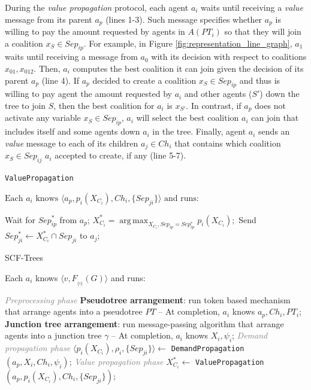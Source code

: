 \documentclass[11pt, twoside, titlepage, a4paper, openright]{report}
\begin{document}
During the \emph{value propagation} protocol, each agent $a_i$ waits until
receiving a \emph{value} message from its parent $a_p$ (lines 1-3). Such message
specifies whether $a_p$ is willing to pay the amount requested by agents in
$A(PT_i)$ so that they will join a coalition $x_S\in Sep_{ip}$. For example, in
Figure \ref{fig:representation_line_graph}, $a_1$ waits until receiving a
message from $a_0$ with its decision with respect to coalitions
$x_{01},x_{012}$. Then, $a_i$ computes the best coalition it can join given the
decision of its parent $a_p$ (line 4). If $a_p$ decided to create a coalition
$x_S\in Sep_{ip}$ and thus is willing to pay agent the amount requested by $a_i$
and other agents ($S'$) down the tree to join $S$, then the best coalition for
$a_i$ is $x_{S'}$. In contrast, if $a_p$ does not activate any variable $x_S\in
Sep_{ip}$, $a_i$ will select the best coalition
 $a_i$ can join that includes itself and some agents down $a_i$ in
the tree. Finally, agent $a_i$ sends an \emph{value} message to each of its
children $a_j \in Ch_i$ that contains which coalition $x_S\in Sep_{ij}$ $a_i$ accepted to
create, if any (line 5-7).

\begin{algorithm}[!tb]
\caption{\texttt{ValuePropagation}} 
\small $\text{Each } a_i \text{ knows } \langle
a_p,p_i(X_{C_i}),Ch_i,\{Sep_{ji}\}\rangle\text{ and runs:}$
\small
\begin{algorithmic}[1]
  		\State  Wait for $Sep^*_{ip}$ from $a_p$;
    \EndIf
     \State $X^*_{C_i} = \operatorname*{arg\,max}_{X_{C_i}, Sep_{ip} = Sep^*_{ip} }
  	     p_i(X_{C_i});$
        \State Send $Sep^*_{ji}\leftarrow X^*_{C_i}\cap Sep_{ji}$ to $a_j$;
    \EndFor
\end{algorithmic}
\label{proc:valuepropagation}
\end{algorithm}

\begin{algorithm}[!tb]
\caption{\label{Alg:stableCoalitionOnTrees}SCF-Trees} 
Each $a_i$ knows $\langle v, F_{_{\{i\}}}(G)\rangle$ and runs: 
\begin{algorithmic}[1]  
	\State \textcolor{gray}{\textit{Preprocessing phase}}
	\State \textbf{Pseudotree arrangement}: run token based mechanism that arrange
	agents into a pseudotree $PT$ -- At completion, $a_i$ knows $a_p,Ch_i,PT_i$;
	\State \textbf{Junction tree arrangement}: run message-passing algorithm that
	arrange agents into a junction tree $\gamma$ -- At completion, $a_i$ knows
	$X_i,\psi_i$; \State \textcolor{gray}{\textit{Demand propagation phase}}
	\State $\langle p_i(X_{C_i}),\rho_i,\{Sep_{ji}\}
	\rangle \leftarrow$ \texttt{DemandPropagation}$(a_p,X_i,Ch_i,\psi_i)$; 
	\State \textcolor{gray}{\textit{Value propagation phase}}
		\State $X^*_{C_i} \leftarrow$ \texttt{ValuePropagation}$(a_p,p_i(X_{C_i}),Ch_i,\{Sep_{ji}\})$;
\end{algorithmic}
\end{algorithm}
\end{document}
